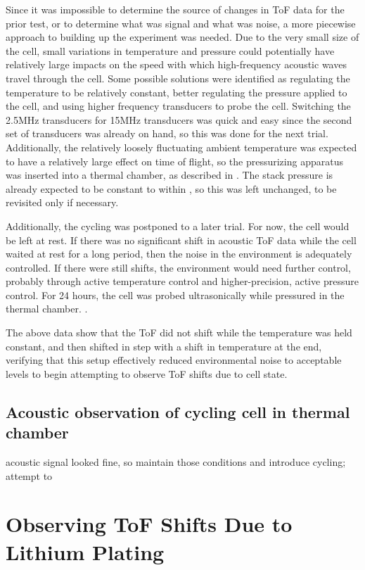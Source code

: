 Since it was impossible to determine the source of changes in ToF data for the prior test, or to determine what was signal and what was noise, a more piecewise approach to building up the experiment was needed. Due to the very small size of the cell, small variations in temperature and pressure could potentially have relatively large impacts on the speed with which high-frequency acoustic waves travel through the cell. Some possible solutions were identified as regulating the temperature to be relatively constant, better regulating the pressure applied to the cell, and using higher frequency transducers to probe the cell. Switching the 2.5MHz transducers for 15MHz transducers was quick and easy since the second set of transducers was already on hand, so this was done for the next trial. Additionally, the relatively loosely fluctuating ambient temperature was expected to have a relatively large effect on time of flight, so the pressurizing apparatus was inserted into a thermal chamber, as described in . The stack pressure is already expected to be constant to within , so this was left unchanged, to be revisited only if necessary.

Additionally, the cycling was postponed to a later trial. For now, the cell would be left at rest. If there was no significant shift in acoustic ToF data while the cell waited at rest for a long period, then the noise in the environment is adequately controlled. If there were still shifts, the environment would need further control, probably through active temperature control and higher-precision, active pressure control. For 24 hours, the cell was probed ultrasonically while pressured in the thermal chamber. .

The above data show that the ToF did not shift while the temperature was held constant, and then shifted in step with a shift in temperature at the end, verifying that this setup effectively reduced environmental noise to acceptable levels to begin attempting to observe ToF shifts due to cell state.

    
\subsection{Acoustic observation of cycling cell in thermal chamber}
    acoustic signal looked fine, so maintain those conditions and introduce cycling; attempt to 
    

\section{Observing ToF Shifts Due to Lithium Plating} 

